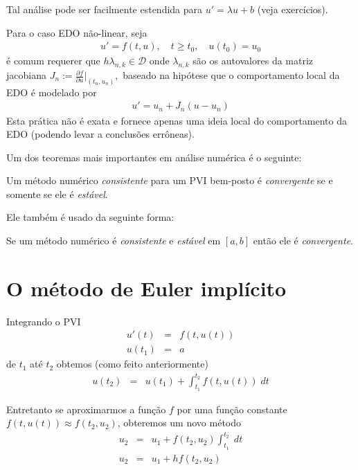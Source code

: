 Tal análise pode ser facilmente estendida para $u'=\lambda u+b$ (veja exercícios).

Para o caso EDO não-linear, seja
\begin{eqnarray}
u'= f(t,u), \quad  t\geq t_0, \quad  u(t_0)=u_0
\end{eqnarray}
é comum requerer que $h\lambda _{n,k} \in \mathcal D$ onde $\lambda _{n,k}$ são os autovalores da matriz jacobiana $J_n := \frac{\partial f}{\partial u}|_{(t_n,u_n)},$ baseado na hipótese que o comportamento local da EDO é modelado por
\begin{eqnarray}
  u'= u_n + J_n(u-u_n)
\end{eqnarray}
Esta prática não é exata e fornece apenas uma ideia local do comportamento da EDO (podendo levar a conclusões errôneas).


Um dos teoremas mais importantes em análise numérica é o seguinte:

\begin{teo}
Um método numérico \emph{consistente} para um PVI bem-posto é \emph{convergente} se e somente se ele é \emph{estável}.
\end{teo}


Ele também é usado da seguinte forma:

\begin{teo}
Se um método numérico é \emph{consistente} e \emph{estável} em $[a,b]$ então ele é \emph{convergente}.
\end{teo}











\section{O método de Euler implícito}
Integrando o PVI
\begin{eqnarray}
  u'(t)  &=& f(t,u(t)) \\
  u(t_1) &=& a
\end{eqnarray}
de $t_1$ até $t_2$ obtemos (como feito anteriormente)
\begin{eqnarray}
  u(t_2)      &=& u(t_1) +  \int_{t_1}^{t_2} f(t,u(t)) \; dt
\end{eqnarray}

Entretanto se aproximarmos a função $f$ por uma função constante $f(t,u(t)) \approx  f(t_2,u_2)$, obteremos um novo método
\begin{eqnarray}
  u_2 &=&  u_1 + f(t_2,u_2) \int _{t_1}^{t_2}  \; dt \\
  u_2 &=&  u_1 + h f(t_2,u_2)
\end{eqnarray}



